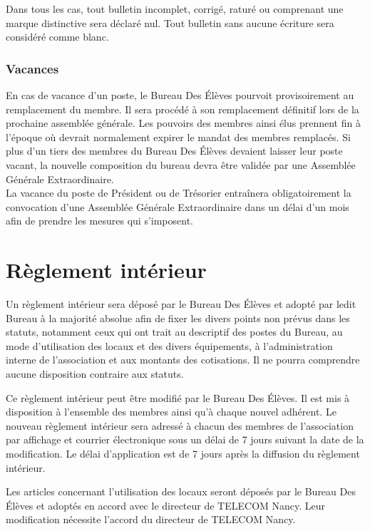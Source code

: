 \documentclass{article} %
\begin{document}
				Dans tous les cas, tout bulletin incomplet, corrigé, raturé ou comprenant une marque distinctive sera déclaré nul.
				Tout bulletin sans aucune écriture sera considéré comme blanc.

			\subsubsection{Vacances}
				En cas de vacance d'un poste, le Bureau Des Élèves pourvoit provisoirement au remplacement du membre. Il sera procédé à son remplacement définitif
				lors de la prochaine assemblée générale. Les pouvoirs des membres ainsi élus prennent fin à l’époque où devrait normalement expirer le mandat des membres
				remplacés. Si plus d’un tiers des membres du Bureau Des Élèves devaient laisser leur poste vacant, la nouvelle composition du bureau devra être validée
				par une Assemblée Générale Extraordinaire.\\
				La vacance du poste de Président ou de Trésorier entraînera obligatoirement la convocation d’une Assemblée Générale Extraordinaire dans un délai d’un mois
				afin de prendre les mesures qui s’imposent.

	\section{Règlement intérieur}
		Un règlement intérieur sera déposé par le Bureau Des Élèves et adopté par ledit Bureau à la majorité absolue afin de fixer les divers points
		non prévus dans les statuts, notamment ceux qui ont trait au descriptif des postes du Bureau, au mode d’utilisation des locaux et des divers équipements,
		à l’administration interne de l’association et aux montants des cotisations. Il ne pourra comprendre aucune disposition contraire aux statuts.

		Ce règlement intérieur peut être modifié par le Bureau Des Élèves. Il est mis à disposition à l’ensemble des membres ainsi qu’à chaque nouvel adhérent.
		Le nouveau règlement intérieur sera adressé à chacun des membres de l'association par affichage et courrier électronique sous un délai de 7 jours suivant la date de la modification.
		Le délai d’application est de 7 jours après la diffusion du règlement intérieur.

		Les articles concernant l’utilisation des locaux seront déposés par le Bureau Des Élèves et adoptés en accord avec le directeur de TELECOM Nancy.
		Leur modification nécessite l’accord du directeur de TELECOM Nancy.
\end{document}

